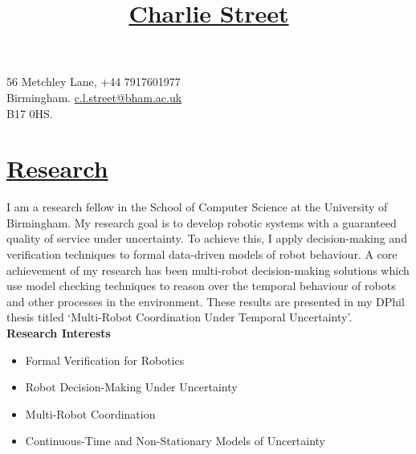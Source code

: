 \documentclass[11pt]{article}
\title{\vspace{-70pt}\Huge\underline{Charlie Street}}
\date{}
\begin{document}
\maketitle
\vspace*{-60pt}

\begin{flushleft}
\noindent
\large 56 Metchley Lane,
\hfill 
\large +44 7917601977 \\
\large Birmingham. 
\hfill
\large
\large \href{mailto:c.l.street@bham.ac.uk}{\url{c.l.street@bham.ac.uk}} \\
\large B17 0HS.
\iffalse
\hfill
\large
\href{https://www.birmingham.ac.uk/staff/profiles/computer-science/research-fellow/street-charlie.aspx}{\texttt{UoB Staff Profile}}\fi \\
\end{flushleft}
	
\section*{\uline{Research}}	

I am a research fellow in the School of Computer Science at the University of Birmingham.
%
My research goal is to develop robotic systems with a guaranteed quality of service under uncertainty.
%
To achieve this, I apply decision-making and verification techniques to formal data-driven models of robot behaviour.
%
A core achievement of my research has been multi-robot decision-making solutions which use model checking techniques to reason over the temporal behaviour of robots and other processes in the environment.
%
These results are presented in my DPhil thesis titled `Multi-Robot Coordination Under Temporal Uncertainty'.\\

\iffalse
NEEDS UPDATE:
I am a postdoctoral research assistant in the Goal-Oriented Autonomous Long-Lived Systems (GOALS) Lab at the Oxford Robotics Institute, University of Oxford.
%
My current research is focused on the robust continuous-time coordination of multi-robot systems under uncertainty.
%
To achieve this, I apply planning, model checking, and task allocation techniques to continuous-time models of multi-robot behaviour.\\
\fi

\noindent \textbf{Research Interests}
\begin{itemize}
    \item Formal Verification for Robotics 
    \item Robot Decision-Making Under Uncertainty
    \item Multi-Robot Coordination
    \item Continuous-Time and Non-Stationary Models of Uncertainty
\end{itemize}
\end{document}
